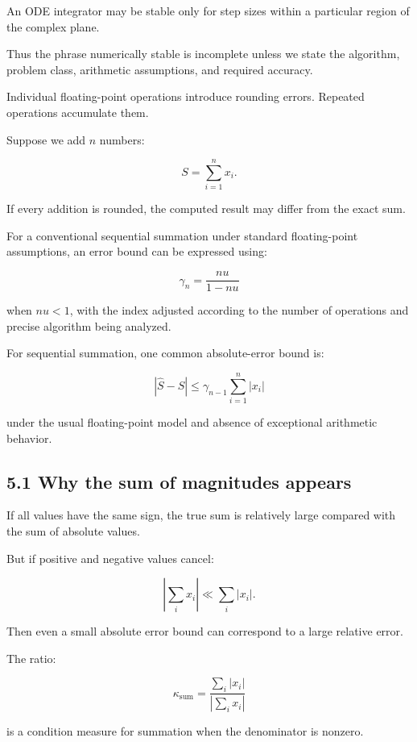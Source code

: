 An ODE integrator may be stable only for step sizes within a particular region of the complex plane.

Thus the phrase numerically stable is incomplete unless we state the algorithm, problem class, arithmetic assumptions, and required accuracy.

Individual floating-point operations introduce rounding errors. Repeated operations accumulate them.

Suppose we add \(n\) numbers:

\[ S=\sum_{i=1}^{n}x_i. \]

If every addition is rounded, the computed result may differ from the exact sum.

For a conventional sequential summation under standard floating-point assumptions, an error bound can be expressed using:

\[ \boxed{ \gamma_n= \frac{nu}{1-nu} } \]

when \(nu<1\), with the index adjusted according to the number of operations and precise algorithm being analyzed.

For sequential summation, one common absolute-error bound is:

\[ \boxed{ |\hat S-S| \le \gamma_{n-1} \sum_{i=1}^{n}|x_i| } \]

under the usual floating-point model and absence of exceptional arithmetic behavior.

\subsection{5.1 Why the sum of magnitudes appears}\label{02-foundations-ii-ch028-why-the-sum-of-magnitudes-appears}

\hypertarget{02-foundations-ii-ch028-why-the-sum-of-magnitudes-appears}{}

If all values have the same sign, the true sum is relatively large compared with the sum of absolute values.

But if positive and negative values cancel:

\[ \left|\sum_ix_i\right| \ll \sum_i|x_i|. \]

Then even a small absolute error bound can correspond to a large relative error.

The ratio:

\[ \boxed{ \kappa_{\mathrm{sum}} = \frac{\sum_i|x_i|} {\left|\sum_ix_i\right|} } \]

is a condition measure for summation when the denominator is nonzero.

